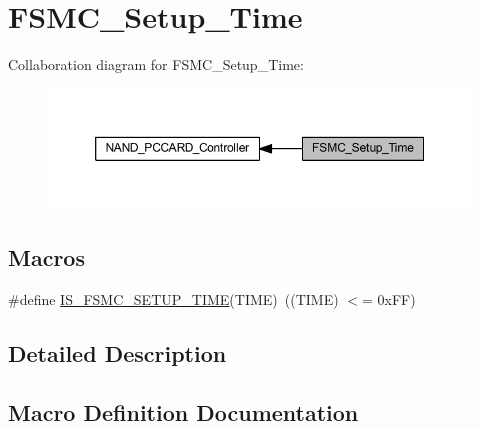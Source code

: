 \hypertarget{group___f_s_m_c___setup___time}{}\section{F\+S\+M\+C\+\_\+\+Setup\+\_\+\+Time}
\label{group___f_s_m_c___setup___time}
Collaboration diagram for F\+S\+M\+C\+\_\+\+Setup\+\_\+\+Time\+:
\nopagebreak
\begin{figure}[H]
\begin{center}
\leavevmode
\includegraphics[width=350pt]{group___f_s_m_c___setup___time}
\end{center}
\end{figure}
\subsection*{Macros}
\begin{DoxyCompactItemize}
\item 
\#define \hyperlink{group___f_s_m_c___setup___time_ga4f2fbb8f6ec492cc241a49c468e0d98d}{I\+S\+\_\+\+F\+S\+M\+C\+\_\+\+S\+E\+T\+U\+P\+\_\+\+T\+I\+ME}(T\+I\+ME)~((T\+I\+ME) $<$= 0x\+F\+F)
\end{DoxyCompactItemize}


\subsection{Detailed Description}


\subsection{Macro Definition Documentation}
\mbox{\label{group___f_s_m_c___setup___time_ga4f2fbb8f6ec492cc241a49c468e0d98d}} 
